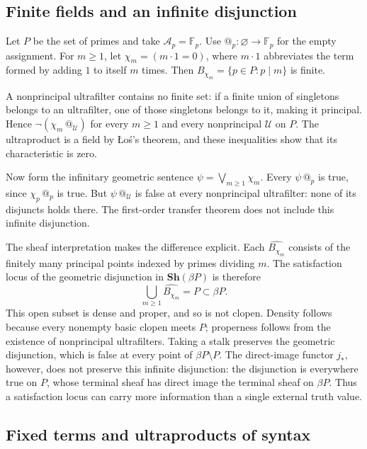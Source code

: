 \documentclass[11pt]{article}
\makeatletter
\newcommand{\atsign}{\mathord{@}}
\theoremstyle{definition}
\makeatother
\begin{document}
\subsection{Finite fields and an infinite disjunction}

Let \(P\) be the set of primes and take \(\mathcal A_p=\mathbb F_p\).
Use \(\atsign_p:\varnothing\to\mathbb F_p\) for the empty assignment.
For \(m\geq1\), let
\(\chi_m=(m\cdot1=0)\), where \(m\cdot1\) abbreviates the term formed
by adding \(1\) to itself \(m\) times. Then
\(B_{\chi_m}=\{p\in P:p\mid m\}\) is finite.

A nonprincipal ultrafilter contains no finite set: if a finite union of
singletons belongs to an ultrafilter, one of those singletons belongs
to it, making it principal. Hence
\(\neg(\chi_m\,\atsign_{\mathcal U})\) for every \(m\geq1\) and every
nonprincipal \(\mathcal U\) on \(P\).
The ultraproduct is a field by \L{}o\'s's theorem, and these inequalities
show that its characteristic is zero.

Now form the infinitary geometric sentence
\(\psi=\bigvee_{m\geq1}\chi_m\).
Every \(\psi\,\atsign_p\) is true, since \(\chi_p\,\atsign_p\) is true.
But \(\psi\,\atsign_{\mathcal U}\) is false at every nonprincipal
ultrafilter: none of its disjuncts holds there.
The first-order transfer theorem does not include this infinite
disjunction.

The sheaf interpretation makes the difference explicit.
Each \(\widehat{B_{\chi_m}}\) consists of the finitely many principal
points indexed by primes dividing \(m\). The satisfaction locus of the
geometric disjunction in \(\mathbf{Sh}(\beta P)\) is therefore
\[
\bigcup_{m\geq1}\widehat{B_{\chi_m}}=P\subset\beta P.
\]
This open subset is dense and proper, and so is not clopen. Density
follows because every nonempty basic clopen meets \(P\); properness
follows from the existence of nonprincipal ultrafilters.
Taking a stalk preserves the geometric disjunction, which is false at
every point of \(\beta P\setminus P\).
The direct-image functor \(j_*\), however, does not preserve this
infinite disjunction: the disjunction is everywhere true on \(P\),
whose terminal sheaf has direct image the terminal sheaf on \(\beta P\).
Thus a satisfaction locus can carry more information than a single
external truth value.

\subsection{Fixed terms and ultraproducts of syntax}
\end{document}
